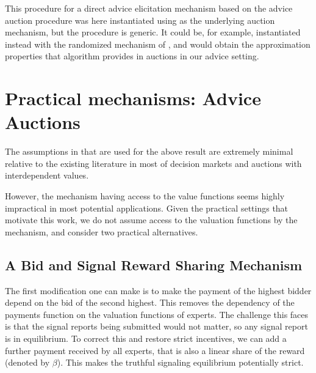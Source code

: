 This procedure for a direct advice elicitation mechanism based on the advice auction procedure was here instantiated using \citep{maskin1992auctions}  as the underlying auction mechanism, but the procedure is generic. It could be, for example, instantiated instead with the randomized mechanism of \citep{eden2018interdependent}, and would obtain the approximation properties that algorithm provides in auctions in our advice setting.


\section{Practical mechanisms: Advice Auctions}

The assumptions in \citep{roughgarden2016optimal} that are used for the above result are extremely minimal relative to the existing literature in most of decision markets and auctions with interdependent values.

However, the mechanism having access to the value functions seems highly impractical in most potential applications.
Given the practical settings that motivate this work, 
we do not assume access to the valuation functions by the mechanism, and consider two practical alternatives.


\subsection{A Bid and Signal Reward Sharing Mechanism}

The first modification one can make is to make the payment of the highest bidder depend on the bid of the second highest. This removes the dependency of the payments function on the valuation functions of experts.
The challenge this faces is that the signal reports being submitted would not matter, so any signal report is in equilibrium. To correct this and restore strict incentives, we can add a further payment received by all experts, that is also a linear share of the reward (denoted by $\beta$). This makes the truthful signaling equilibrium potentially strict.


